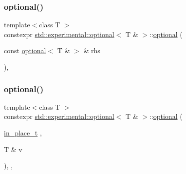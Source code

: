 \mbox{\label{classstd_1_1experimental_1_1optional_3_01_t_01_6_01_4_ad9dc3e3c32f40151798d6ce2f0435b0d}} 
\subsubsection{\texorpdfstring{optional()}{optional()}\hspace{0.1cm}{\footnotesize\ttfamily [5/7]}}
{\footnotesize\ttfamily template$<$class T $>$ \\
constexpr \hyperlink{classstd_1_1experimental_1_1optional}{std\+::experimental\+::optional}$<$ T \& $>$\+::\hyperlink{classstd_1_1experimental_1_1optional}{optional} (\begin{DoxyParamCaption}\item[{const \hyperlink{classstd_1_1experimental_1_1optional}{optional}$<$ T \& $>$ \&}]{rhs }\end{DoxyParamCaption})\hspace{0.3cm}{\ttfamily [inline]}, {\ttfamily [noexcept]}}

\mbox{\label{classstd_1_1experimental_1_1optional_3_01_t_01_6_01_4_a5c5cac399d59bc9d499a369367110289}} 
\subsubsection{\texorpdfstring{optional()}{optional()}\hspace{0.1cm}{\footnotesize\ttfamily [6/7]}}
{\footnotesize\ttfamily template$<$class T $>$ \\
constexpr \hyperlink{classstd_1_1experimental_1_1optional}{std\+::experimental\+::optional}$<$ T \& $>$\+::\hyperlink{classstd_1_1experimental_1_1optional}{optional} (\begin{DoxyParamCaption}\item[{\hyperlink{structstd_1_1experimental_1_1in__place__t}{in\+\_\+place\+\_\+t}}]{,  }\item[{T \&}]{v }\end{DoxyParamCaption})\hspace{0.3cm}{\ttfamily [inline]}, {\ttfamily [explicit]}, {\ttfamily [noexcept]}}

